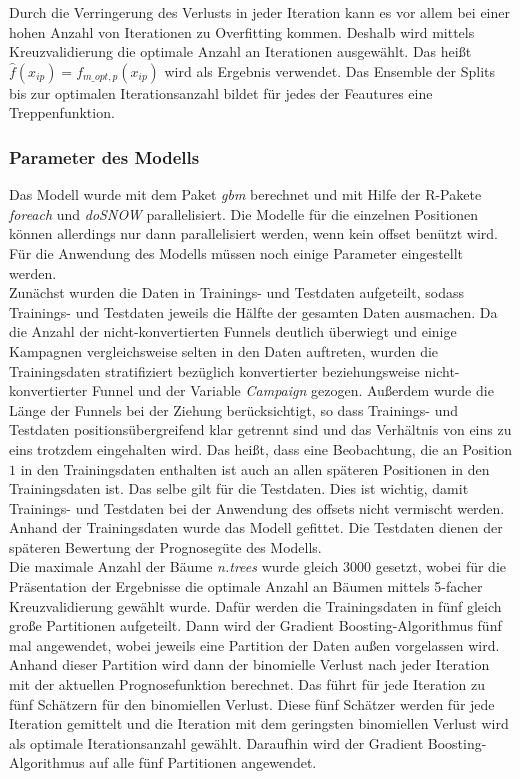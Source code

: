 Durch die Verringerung des Verlusts in jeder Iteration kann es vor allem bei einer hohen Anzahl von Iterationen zu Overfitting kommen. Deshalb wird mittels Kreuzvalidierung die optimale Anzahl an Iterationen ausgewählt. Das heißt $\hat{f}(x_{ip}) = f_{m\_opt,p}(x_{ip})$ wird als Ergebnis verwendet. Das Ensemble der Splits bis zur optimalen Iterationsanzahl bildet für jedes der Feautures eine Treppenfunktion.

\subsubsection*{Parameter des Modells}

Das Modell wurde mit dem Paket \textit{gbm} \cite{gbm} berechnet und mit Hilfe der R-Pakete \textit{foreach} \cite{foreach} und \textit{doSNOW} \cite{dosnow} parallelisiert. Die Modelle für die einzelnen Positionen können allerdings nur dann parallelisiert werden, wenn kein offset benützt wird. Für die Anwendung des Modells müssen noch einige Parameter eingestellt werden.\\
Zunächst wurden die Daten in Trainings- und Testdaten aufgeteilt, sodass Trainings- und Testdaten jeweils die Hälfte der gesamten Daten ausmachen. Da die Anzahl der nicht-konvertierten Funnels deutlich überwiegt und einige Kampagnen vergleichsweise selten in den Daten auftreten, wurden die Trainingsdaten stratifiziert bezüglich konvertierter beziehungsweise nicht-konvertierter Funnel und der Variable \textit{Campaign} gezogen. Außerdem wurde die Länge der Funnels bei der Ziehung berücksichtigt, so dass  Trainings- und Testdaten positionsübergreifend klar getrennt sind und das Verhältnis von eins zu eins trotzdem eingehalten wird. Das heißt, dass eine Beobachtung, die an Position $1$ in den Trainingsdaten enthalten ist auch an allen späteren Positionen in den Trainingsdaten ist. Das selbe gilt für die Testdaten. Dies ist wichtig, damit Trainings- und Testdaten bei der Anwendung des offsets nicht vermischt werden. Anhand der Trainingsdaten wurde das Modell gefittet. Die Testdaten dienen der späteren Bewertung der Prognosegüte des Modells.\\
Die maximale Anzahl der Bäume \textit{n.trees} wurde gleich $3000$ gesetzt, wobei für die Präsentation der Ergebnisse die optimale Anzahl an Bäumen mittels 5-facher Kreuzvalidierung gewählt wurde. Dafür werden die Trainingsdaten in fünf gleich große Partitionen aufgeteilt. Dann wird der Gradient Boosting-Algorithmus fünf mal angewendet, wobei jeweils eine Partition der Daten außen vorgelassen wird. Anhand dieser Partition wird dann der binomielle Verlust nach jeder Iteration mit der aktuellen Prognosefunktion berechnet. Das führt für jede Iteration zu fünf Schätzern für den binomiellen Verlust. Diese fünf Schätzer werden für jede Iteration gemittelt und die Iteration mit dem geringsten binomiellen Verlust wird als optimale Iterationsanzahl gewählt. Daraufhin wird der Gradient Boosting-Algorithmus auf alle fünf Partitionen angewendet.\\
